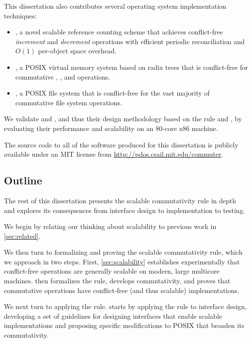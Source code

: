 \noindent
This dissertation also contributes several operating system
implementation techniques:

\begin{itemize}

\item {}, a novel scalable reference counting scheme that
  achieves conflict-free \emph{increment} and \emph{decrement}
  operations with efficient periodic reconciliation and $O(1)$
  per-object space overhead.

\item \vm, a POSIX virtual memory system based on radix trees that is
  conflict-free for commutative , , and
   operations.

\item \fs, a POSIX file system that is conflict-free for the vast
  majority of commutative file system operations.

\end{itemize}

\noindent
We validate \vm and \fs, and thus their design methodology based on
the rule and \tool, by evaluating their performance and scalability on
an 80-core x86 machine.

The source code to all of the software produced for this dissertation
is publicly available under an MIT license from
\url{http://pdos.csail.mit.edu/commuter}.


\subsection{Outline}

The rest of this dissertation presents the scalable commutativity rule
in depth and explores its consequences from interface design to
implementation to testing.

We begin by relating our thinking about scalability to previous work
in \cref{sec:related}.

We then turn to formalizing and proving the scalable commutativity
rule, which we approach in two steps.  First, \cref{sec:scalability}
establishes experimentally that conflict-free operations are generally
scalable on modern, large multicore machines.   then
formalizes the rule, develops \SIM commutativity, and proves that
commutative operations have conflict-free (and thus scalable)
implementations.

We next turn to applying the rule.   starts by
applying the rule to interface design, developing a set of guidelines
for designing interfaces that enable scalable implementations and
proposing specific modifications to POSIX that broaden its
commutativity.

